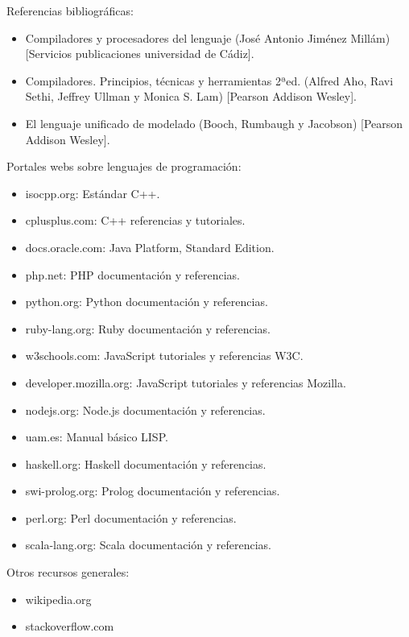 Referencias bibliográficas:
\begin{itemize}
\item Compiladores y procesadores del lenguaje (José Antonio Jiménez Millám) [Servicios publicaciones universidad de Cádiz].
\item Compiladores. Principios, técnicas y herramientas 2ªed. (Alfred Aho, Ravi Sethi, Jeffrey Ullman y Monica S. Lam) [Pearson Addison Wesley].
\item El lenguaje unificado de modelado (Booch, Rumbaugh y Jacobson) [Pearson Addison Wesley].
\end{itemize}

Portales webs sobre lenguajes de programación:
\begin{itemize}
\item isocpp.org: Estándar C++.
\item cplusplus.com: C++ referencias y tutoriales.
\item docs.oracle.com: Java Platform, Standard Edition.
\item php.net: PHP documentación y referencias.
\item python.org: Python documentación y referencias.
\item ruby-lang.org: Ruby documentación y referencias.
\item w3schools.com: JavaScript tutoriales y referencias W3C.
\item developer.mozilla.org: JavaScript tutoriales y referencias Mozilla.
\item nodejs.org: Node.js documentación y referencias.
\item uam.es: Manual básico LISP.
\item haskell.org: Haskell documentación y referencias.
\item swi-prolog.org: Prolog documentación y referencias.
\item perl.org: Perl documentación y referencias.
\item scala-lang.org: Scala documentación y referencias.
\end{itemize}
\pagebreak
Otros recursos generales:
\begin{itemize}
\item wikipedia.org
\item stackoverflow.com
\end{itemize}
